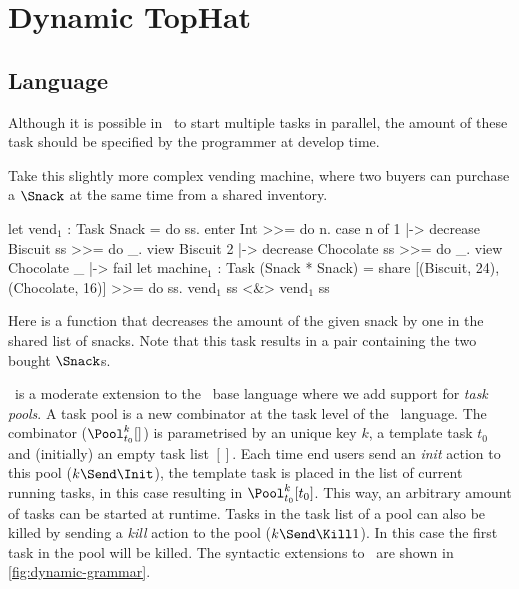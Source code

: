 
\section{Dynamic TopHat}
\label{sec:dyntophat}

\subsection{Language}

Although it is possible in \TOPHAT\ to start multiple tasks in parallel,
the amount of these task should be specified by the programmer at develop time.

\begin{example}
  \label{exm:vending-shared}
  Take this slightly more complex vending machine,
  where two buyers can purchase a $\Snack$ at the same time from a shared inventory.

  \begin{TASK}[]
    let vend$_1$ : Task Snack = do ss.
      enter Int >>= do n.
      case n of
        1 |-> decrease Biscuit ss >>= do _.
             view Biscuit
        2 |-> decrease Chocolate ss >>= do _.
             view Chocolate
        _ |-> fail
    let machine$_1$ : Task (Snack * Snack) =
      share [(Biscuit, 24), (Chocolate, 16)] >>= do ss.
      vend$_1$ ss <&> vend$_1$ ss
  \end{TASK}

  Here  is a function that decreases the amount of the given snack by one in the shared list of snacks.
  Note that this task results in a pair containing the two bought $\Snack$s.
\end{example}

\DYNTOPHAT\ is a moderate extension to the \TOPHAT\ base language where we add support for \emph{task pools}.
A task pool is a new combinator at the task level of the \TOPHAT\ language.
The combinator ($\Pool^k_{t_0} []$) is parametrised by an unique key $k$, a template task $t_0$ and (initially) an empty task list $[]$.
Each time end users send an \emph{init} action to this pool ($k\Send\Init$),
the template task is placed in the list of current running tasks,
in this case resulting in $\Pool^k_{t_0} [t_0]$.
This way, an arbitrary amount of tasks can be started at runtime.
Tasks in the task list of a pool can also be killed by sending a \emph{kill} action to the pool ($k\Send\Kill1$).
In this case the first task in the pool will be killed.
The syntactic extensions to \TOPHAT\ are shown in \cref{fig:dynamic-grammar}.


